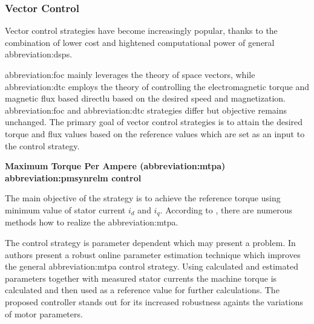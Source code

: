 \documentclass[a4paper, twoside, 11pt]{article}
\begin{document}
        \subsubsection{Vector Control}
            Vector control strategies have become increasingly popular, thanks to the combination of lower cost and hightened computational power of general \gls{abbreviation:dsp}s. \cite{dwivedi-review-on-control-strategies-of-permanent-magnet-assisted-synchronous-reluctance-motor-drive}
            \par
            \gls{abbreviation:foc} mainly leverages the theory of space vectors, while \gls{abbreviation:dtc} employs the theory of controlling the electromagnetic torque and magnetic flux based directlu based on the desired speed and magnetization. \gls{abbreviation:foc} and \gls{abbreviation:dtc} strategies differ but objective remains unchanged. The primary goal of vector control strategies is to attain the desired torque and flux values based on the reference values which are set as an input to the control strategy. \cite{heidari-a-review-of-synchronour-relucatence-motor-drive-advancements, dwivedi-review-on-control-strategies-of-permanent-magnet-assisted-synchronous-reluctance-motor-drive}
            
            \vspace*{1.5cm}
             \hspace*{-\parindent} \textbf{Maximum Torque Per Ampere (\gls{abbreviation:mtpa}) \gls{abbreviation:pmsynrelm} control}\par
                \hspace*{\parindent} The main objective of the strategy is to achieve the reference torque using minimum value of stator current $i_d$ and $i_q$. According to \cite{dwivedi-review-on-control-strategies-of-permanent-magnet-assisted-synchronous-reluctance-motor-drive}, there are numerous methods how to realize the \gls{abbreviation:mtpa}.\par
                The control strategy is parameter dependent which may present a problem. In \cite{niazi-robust-maximum-torque-per-ampere-control-of-pmsynrelm} authors present a robust online parameter estimation technique which improves the general \gls{abbreviation:mtpa} control strategy. Using calculated and estimated parameters together with measured stator currents the machine torque is calculated and then used as a reference value for further calculations. The proposed controller stands out for its increased robustness againts the variations of motor parameters.
\end{document}
